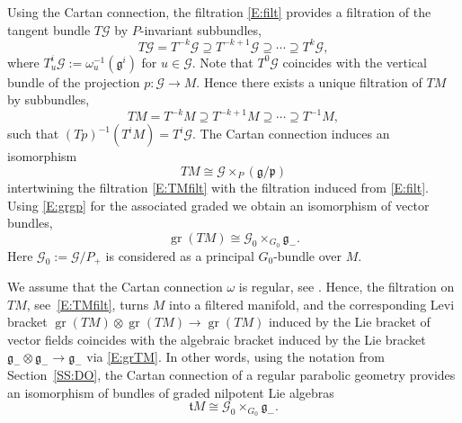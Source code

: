 \documentclass[reqno,12pt]{amsart}
\DeclareMathOperator{\gr}{gr}
\newcommand\goe{\mathfrak g}
\newcommand\poe{\mathfrak p}
\theoremstyle{plain}
\theoremstyle{definition}
\begin{document}
Using the Cartan connection, the filtration \eqref{E:filt} provides a filtration of the tangent bundle $T\mathcal G$ by $P$-invariant subbundles, 
$$
T\mathcal G=T^{-k}\mathcal G\supseteq T^{-k+1}\mathcal G\supseteq\cdots\supseteq T^k\mathcal G,
$$
where $T^i_u\mathcal G:=\omega_u^{-1}(\goe^i)$ for $u\in\mathcal G$. 
Note that $T^0\mathcal G$ coincides with the vertical bundle of the projection $p\colon\mathcal G\to M$.
Hence there exists a unique filtration of $TM$ by subbundles,
\begin{equation}\label{E:TMfilt}
TM=T^{-k}M\supseteq T^{-k+1}M\supseteq\cdots\supseteq T^{-1}M,
\end{equation}
such that $(Tp)^{-1}(T^iM)=T^i\mathcal G$.
The Cartan connection induces an isomorphism
\begin{equation}\label{E:TMgp}
TM\cong\mathcal G\times_P(\goe/\poe)
\end{equation}
intertwining the filtration \eqref{E:TMfilt} with the filtration induced from \eqref{E:filt}.
Using \eqref{E:grgp} for the associated graded we obtain an isomorphism of vector bundles,
\begin{equation}\label{E:grTM}
\gr(TM)\cong\mathcal G_0\times_{G_0}\goe_-.
\end{equation}
Here $\mathcal G_0:=\mathcal G/P_+$ is considered as a principal $G_0$-bundle over $M$.


We assume that the Cartan connection $\omega$ is regular, see \cite[Definition~3.1.7]{CS09}.
Hence, the filtration on $TM$, see~\eqref{E:TMfilt}, turns $M$ into a filtered manifold, and the corresponding Levi bracket $\gr(TM)\otimes\gr(TM)\to\gr(TM)$ induced by the Lie bracket of vector fields coincides with the algebraic bracket induced by the Lie bracket $\goe_-\otimes\goe_-\to\goe_-$ via \eqref{E:grTM}.
In other words, using the notation from Section~\ref{SS:DO}, the Cartan connection of a regular parabolic geometry provides an isomorphism of bundles of graded nilpotent Lie algebras
\begin{equation}\label{E:tMG0}
\mathfrak tM\cong\mathcal G_0\times_{G_0}\goe_-.
\end{equation}
\end{document}
